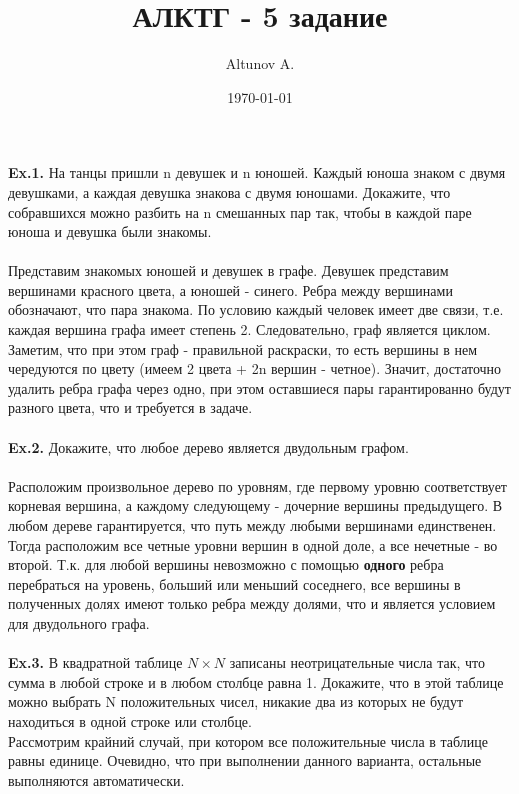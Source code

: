 \documentclass[a4paper,12pt]{article}
\author{Altunov A.}
\title{АЛКТГ - 5 задание}
\date{\today}
\begin{document}
\maketitle
\newpage
\textbf{Ex.1.} На танцы пришли n девушек и n юношей. Каждый юноша знаком с двумя девушками, а каждая девушка знакова с двумя юношами. Докажите, что собравшихся можно разбить на n смешанных пар так, чтобы в каждой паре юноша и девушка были знакомы.
\\
\\
Представим знакомых юношей и девушек в графе. Девушек представим вершинами красного цвета, а юношей - синего. Ребра между вершинами обозначают, что пара знакома. По условию каждый человек имеет две связи, т.е. каждая вершина графа имеет степень 2. Следовательно, граф является циклом. Заметим, что при этом граф - правильной раскраски, то есть вершины в нем чередуются по цвету (имеем 2 цвета + 2n вершин - четное). Значит, достаточно удалить ребра графа через одно, при этом оставшиеся пары гарантированно будут разного цвета, что и требуется в задаче.
\\
\\
\textbf{Ex.2.} Докажите, что любое дерево является двудольным графом.
\\
\\
Расположим произвольное дерево по уровням, где первому уровню соответствует корневая вершина, а каждому следующему - дочерние вершины предыдущего. В любом дереве гарантируется, что путь между любыми вершинами единственен. Тогда расположим все четные уровни вершин в одной доле, а все нечетные - во второй. Т.к. для любой вершины невозможно с помощью \textbf{одного} ребра перебраться на уровень, больший или меньший соседнего, все вершины в полученных долях имеют только ребра между долями, что и является условием для двудольного графа.
\\
\\
\textbf{Ex.3.} В квадратной таблице $ N \times N $ записаны неотрицательные числа
так, что сумма в любой строке и в любом столбце равна 1. Докажите,
что в этой таблице можно выбрать N положительных чисел, никакие
два из которых не будут находиться в одной строке или столбце.
\\

Рассмотрим крайний случай, при котором все положительные числа в таблице равны единице. Очевидно, что при выполнении данного варианта, остальные выполняются автоматически.
\end{document}
